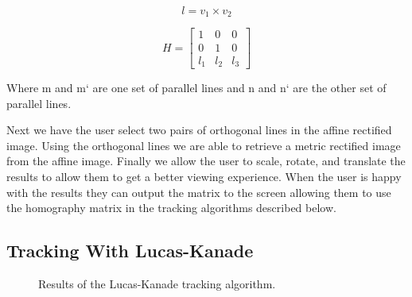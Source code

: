 \documentclass[12pt, onecolumn, conference]{IEEEtran}
\begin{document}
\begin{equation}
l = v_1 \times v_2
\end{equation}

\begin{equation}
H =
\begin{bmatrix}
1 & 0 & 0\\ 
0 & 1 & 0\\ 
l_1 & l_2 & l_3 
\end{bmatrix}
\end{equation}

Where m and m` are one set of parallel lines and n  and n` are the other set of parallel lines.

Next we have the user select two pairs of orthogonal lines in the affine rectified image. Using the orthogonal lines we are able to retrieve a metric rectified image from the affine image. Finally we allow the user to scale, rotate, and translate the results to allow them to get a better viewing experience. When the user is happy with the results they can output the matrix to the screen allowing them to use the homography matrix in the tracking algorithms described below.

\subsection{Tracking With Lucas-Kanade}

\begin{figure}[!t]
\centering
{}
\hfil
{}
\caption{Results of the Lucas-Kanade tracking algorithm.}
\label{LK Tracking}
\end{figure}
\end{document}
